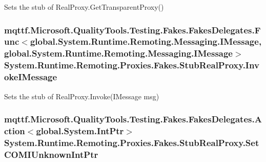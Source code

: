 Sets the stub of Real\-Proxy.\-Get\-Transparent\-Proxy()

\hypertarget{class_system_1_1_runtime_1_1_remoting_1_1_proxies_1_1_fakes_1_1_stub_real_proxy_ad3484bb5396a26249861841433f6ca23}{
\subsubsection[{Invoke\-I\-Message}]{\setlength{\rightskip}{0pt plus 5cm}mqttf.\-Microsoft.\-Quality\-Tools.\-Testing.\-Fakes.\-Fakes\-Delegates.\-Func$<$global.\-System.\-Runtime.\-Remoting.\-Messaging.\-I\-Message, global.\-System.\-Runtime.\-Remoting.\-Messaging.\-I\-Message$>$ System.\-Runtime.\-Remoting.\-Proxies.\-Fakes.\-Stub\-Real\-Proxy.\-Invoke\-I\-Message}}\label{class_system_1_1_runtime_1_1_remoting_1_1_proxies_1_1_fakes_1_1_stub_real_proxy_ad3484bb5396a26249861841433f6ca23}


Sets the stub of Real\-Proxy.\-Invoke(\-I\-Message msg)

\hypertarget{class_system_1_1_runtime_1_1_remoting_1_1_proxies_1_1_fakes_1_1_stub_real_proxy_aaf4927a4ab4c713c22999a033242002e}{
\subsubsection[{Set\-C\-O\-M\-I\-Unknown\-Int\-Ptr}]{\setlength{\rightskip}{0pt plus 5cm}mqttf.\-Microsoft.\-Quality\-Tools.\-Testing.\-Fakes.\-Fakes\-Delegates.\-Action$<$global.\-System.\-Int\-Ptr$>$ System.\-Runtime.\-Remoting.\-Proxies.\-Fakes.\-Stub\-Real\-Proxy.\-Set\-C\-O\-M\-I\-Unknown\-Int\-Ptr}}\label{class_system_1_1_runtime_1_1_remoting_1_1_proxies_1_1_fakes_1_1_stub_real_proxy_aaf4927a4ab4c713c22999a033242002e}


